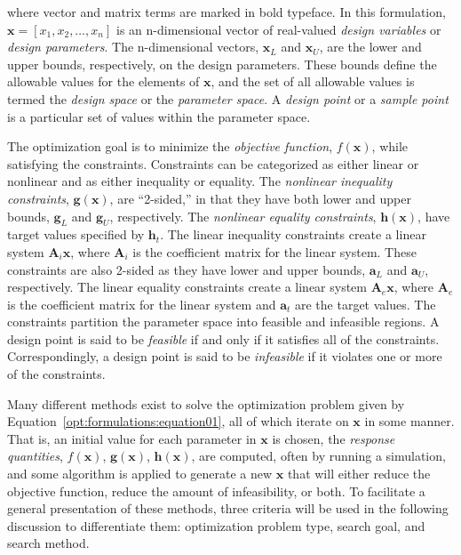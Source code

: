 where vector and matrix terms are marked in bold typeface. In this
formulation, $\mathbf{x}=[x_{1},x_{2},\ldots,x_{n}]$ is an
n-dimensional vector of real-valued \emph{design variables} or
\emph{design parameters}. The n-dimensional vectors, $\mathbf{x}_{L}$
and $\mathbf{x}_U$, are the lower and upper bounds, respectively, on
the design parameters. These bounds define the allowable values for
the elements of $\mathbf{x}$, and the set of all allowable values is
termed the \emph{design space} or the \emph{parameter space}. A
\emph{design point} or a \emph{sample point} is a particular set of 
values within the parameter space.

The optimization goal is to minimize the \emph{objective function},
$f(\mathbf{x})$, while satisfying the constraints. Constraints can be
categorized as either linear or nonlinear and as either inequality or
equality. The \emph{nonlinear inequality constraints},
$\mathbf{g(x)}$, are ``2-sided,'' in that they have both lower and
upper bounds, $\mathbf{g}_L$ and $\mathbf{g}_U$, respectively. The
\emph{nonlinear equality constraints}, $\mathbf{h(x)}$, have target
values specified by $\mathbf{h}_{t}$. The linear inequality
constraints create a linear system $\mathbf{A}_i\mathbf{x}$, where
$\mathbf{A}_i$ is the coefficient matrix for the linear system. These
constraints are also 2-sided as they have lower and upper bounds,
$\mathbf{a}_L$ and $\mathbf{a}_U$, respectively. The linear equality
constraints create a linear system $\mathbf{A}_e\mathbf{x}$, where
$\mathbf{A}_e$ is the coefficient matrix for the linear system and
$\mathbf{a}_{t}$ are the target values. The constraints partition the
parameter space into feasible and infeasible regions. A design point
is said to be \emph{feasible} if and only if it satisfies all of the
constraints. Correspondingly, a design point is said to be
\emph{infeasible} if it violates one or more of the constraints.

Many different methods exist to solve the optimization problem given
by Equation~\ref{opt:formulations:equation01}, all of which iterate on
$\mathbf{x}$ in some manner. That is, an initial value for each
parameter in $\mathbf{x}$ is chosen, the \emph{response quantities},
$f(\mathbf{x})$, $\mathbf{g(x)}$, $\mathbf{h(x)}$, are computed, often
by running a simulation, and some algorithm is applied to generate a
new $\mathbf{x}$ that will either reduce the objective function,
reduce the amount of infeasibility, or both. To facilitate a general
presentation of these methods, three criteria will be used in the
following discussion to differentiate them: optimization problem type,
search goal, and search method.

